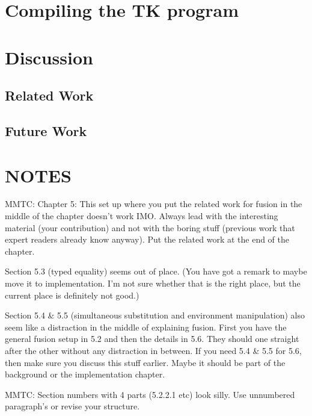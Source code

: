 \section{Compiling the TK program}



\section{Discussion}
\subsection{Related Work}
\subsection{Future Work}


\section*{NOTES}

MMTC: Chapter 5: This set up where you put the related work for fusion in the
middle of the chapter doesn't work IMO. Always lead with the interesting
material (your contribution) and not with the boring stuff (previous work that
expert readers already know anyway). Put the related work at the end of the
chapter.

Section 5.3 (typed equality) seems out of place. (You have got a remark to maybe
move it to implementation. I'm not sure whether that is the right place, but the
current place is definitely not good.)

Section 5.4 \& 5.5 (simultaneous substitution and environment manipulation) also
seem like a distraction in the middle of explaining fusion. First you have the
general fusion setup in 5.2 and then the details in 5.6. They should one
straight after the other without any distraction in between. If you need 5.4 \&
5.5 for 5.6, then make sure you discuss this stuff earlier. Maybe it should be
part of the background or the implementation chapter.

MMTC: Section numbers with 4 parts (5.2.2.1 etc) look silly. Use unnumbered
paragraph's or revise your structure.

